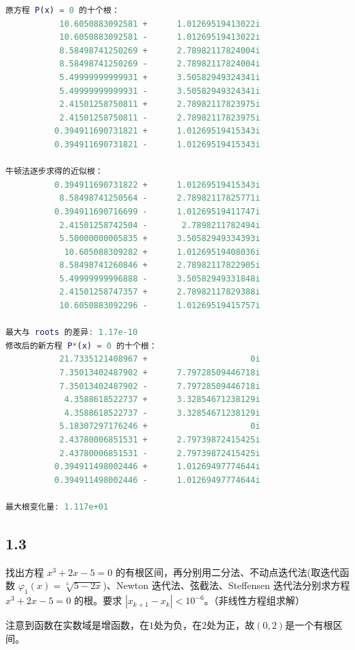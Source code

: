 \begin{lstlisting}[language=matlab]
原方程 P(x) = 0 的十个根：
           10.6050883092581 +      1.01269519413022i
           10.6050883092581 -      1.01269519413022i
           8.58498741250269 +      2.78982117824004i
           8.58498741250269 -      2.78982117824004i
           5.49999999999931 +      3.50582949324341i
           5.49999999999931 -      3.50582949324341i
           2.41501258750811 +      2.78982117823975i
           2.41501258750811 -      2.78982117823975i
          0.394911690731821 +      1.01269519415343i
          0.394911690731821 -      1.01269519415343i

牛顿法逐步求得的近似根：
          0.394911690731822 +      1.01269519415343i
           8.58498741250564 -      2.78982117825771i
          0.394911690716699 -      1.01269519411747i
           2.41501258742504 -       2.7898211782494i
           5.50000000005835 +      3.50582949334393i
            10.605088309282 +      1.01269519408036i
           8.58498741260846 +      2.78982117822905i
           5.49999999996888 -      3.50582949331848i
           2.41501258747357 +      2.78982117829388i
           10.6050883092296 -      1.01269519415757i

最大与 roots 的差异: 1.17e-10
修改后的新方程 P*(x) = 0 的十个根：
           21.7335121408967 +                     0i
           7.35013402487902 +      7.79728509446718i
           7.35013402487902 -      7.79728509446718i
            4.3588618522737 +      3.32854671238129i
            4.3588618522737 -      3.32854671238129i
           5.18307297176246 +                     0i
           2.43780006851531 +      2.79739872415425i
           2.43780006851531 -      2.79739872415425i
          0.394911498002446 +      1.01269497774644i
          0.394911498002446 -      1.01269497774644i

最大根变化量: 1.117e+01
\end{lstlisting}

\subsection*{1.3}
找出方程 $x^3 + 2x - 5 = 0$ 的有根区间，再分别用二分法、不动点迭代法(取迭代函数 $\varphi_1(x) = \sqrt[3]{5-2x}$)、Newton 迭代法、弦截法、Steffensen 迭代法分别求方程 $x^3 + 2x - 5 = 0$ 的根。要求 $|x_{k+1} - x_k| < 10^{-6}$。（非线性方程组求解）

注意到函数在实数域是增函数，在$1$处为负，在$2$处为正，故$(0,2)$是一个有根区间。

